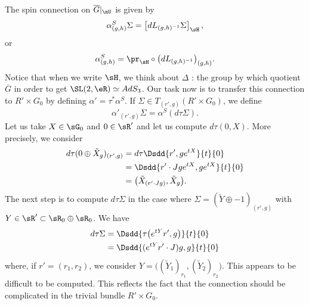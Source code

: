The spin connection on $\overline{G}|_{\mU}$ is given by
\begin{equation}    \label{EqDefConnAdS3}
  \alpha^{S}_{(g,h)}\Sigma=\left[ dL_{(g,h)^{-1}}\Sigma \right]_{\sH},
\end{equation}
or
\begin{equation}
\alpha^{S}_{(g,h)}=\pr_{\sH}\circ\big( dL_{(g,h)^{-1}} \big)_{(g,h)}.
\end{equation}
Notice that when we write $\sH$, we think about $\Delta$ : the group by which quotient  $\overline{G}$ in order to get $\SL(2,\eR)\simeq AdS_3$.
Our task now is to transfer this connection to $R'\times G_0$ by defining $\alpha'=\tau^*\alpha^{S}$. If $\Sigma\in T_{(r',g)}(R'\times G_0)$, we define
\begin{equation}
\alpha'_{(r',g)}\Sigma=\alpha^{S}(d\tau\Sigma).
\end{equation}
Let us take $X\in\sG_0$ and $0\in\sR'$ and let us compute $d\tau(0,X)$. More precisely, we consider
\begin{align*}
d\tau(0\oplus \tilde X_{g})_{(r',g)}&=d\tau\Dsdd{ r',g e^{tX} }{t}{0}\\
        &=\Dsdd{ r'\cdot Jg e^{tX},g e^{tX} }{t}{0}\\
        &=\big( \tilde X_{(r'\cdot Jg)},\tilde X_{g} \big).
\end{align*}
The next step is to compute $d\tau\Sigma$ in the case where $\Sigma=(\utilde Y\oplus -1)_{(r',g)}$ with $Y\in\sR'\subset\sR_{0}\oplus\sR_{0}$. We have
\begin{align}
d\tau\Sigma&=\Dsdd{ \tau\big(  e^{tY}r',g \big) }{t}{0}\\
    &=\Dsdd{ ( e^{tY}r'\cdot J)g,g }{t}{0}
\end{align}
where, if $r'=(r_{1},r_{2})$, we consider $Y=\big((\utilde Y_{1})_{r_{1}},(\utilde Y_{2})_{r_{2}}\big)  $. This appears to be difficult to be computed. This reflects the fact that the connection should be complicated in the trivial bundle $R'\times G_0$.

